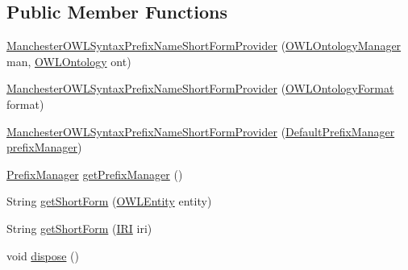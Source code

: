 \subsection*{Public Member Functions}
\begin{DoxyCompactItemize}
\item 
\hyperlink{classuk_1_1ac_1_1manchester_1_1cs_1_1owl_1_1owlapi_1_1mansyntaxrenderer_1_1_manchester_o_w_l_syn9b805e7397984f62b2f3f095697b987e_a808ad37c40144651857610f28c602e46}{Manchester\-O\-W\-L\-Syntax\-Prefix\-Name\-Short\-Form\-Provider} (\hyperlink{interfaceorg_1_1semanticweb_1_1owlapi_1_1model_1_1_o_w_l_ontology_manager}{O\-W\-L\-Ontology\-Manager} man, \hyperlink{interfaceorg_1_1semanticweb_1_1owlapi_1_1model_1_1_o_w_l_ontology}{O\-W\-L\-Ontology} ont)
\item 
\hyperlink{classuk_1_1ac_1_1manchester_1_1cs_1_1owl_1_1owlapi_1_1mansyntaxrenderer_1_1_manchester_o_w_l_syn9b805e7397984f62b2f3f095697b987e_ac0cc52c6250b54a4c8ea37652fcb4279}{Manchester\-O\-W\-L\-Syntax\-Prefix\-Name\-Short\-Form\-Provider} (\hyperlink{classorg_1_1semanticweb_1_1owlapi_1_1model_1_1_o_w_l_ontology_format}{O\-W\-L\-Ontology\-Format} format)
\item 
\hyperlink{classuk_1_1ac_1_1manchester_1_1cs_1_1owl_1_1owlapi_1_1mansyntaxrenderer_1_1_manchester_o_w_l_syn9b805e7397984f62b2f3f095697b987e_a34bd3dbcce5992648ba4ee7cd2a715b0}{Manchester\-O\-W\-L\-Syntax\-Prefix\-Name\-Short\-Form\-Provider} (\hyperlink{classorg_1_1semanticweb_1_1owlapi_1_1util_1_1_default_prefix_manager}{Default\-Prefix\-Manager} \hyperlink{classuk_1_1ac_1_1manchester_1_1cs_1_1owl_1_1owlapi_1_1mansyntaxrenderer_1_1_manchester_o_w_l_syn9b805e7397984f62b2f3f095697b987e_ad36de2fc14a17de20a948af6c6c5cef6}{prefix\-Manager})
\item 
\hyperlink{interfaceorg_1_1semanticweb_1_1owlapi_1_1model_1_1_prefix_manager}{Prefix\-Manager} \hyperlink{classuk_1_1ac_1_1manchester_1_1cs_1_1owl_1_1owlapi_1_1mansyntaxrenderer_1_1_manchester_o_w_l_syn9b805e7397984f62b2f3f095697b987e_acd3e42c786be84e32b37fd06511380d6}{get\-Prefix\-Manager} ()
\item 
String \hyperlink{classuk_1_1ac_1_1manchester_1_1cs_1_1owl_1_1owlapi_1_1mansyntaxrenderer_1_1_manchester_o_w_l_syn9b805e7397984f62b2f3f095697b987e_a1f424c36575a346e0f3932d29e0a84e3}{get\-Short\-Form} (\hyperlink{interfaceorg_1_1semanticweb_1_1owlapi_1_1model_1_1_o_w_l_entity}{O\-W\-L\-Entity} entity)
\item 
String \hyperlink{classuk_1_1ac_1_1manchester_1_1cs_1_1owl_1_1owlapi_1_1mansyntaxrenderer_1_1_manchester_o_w_l_syn9b805e7397984f62b2f3f095697b987e_add13e20a8c64bfd569a242e7a9c45591}{get\-Short\-Form} (\hyperlink{classorg_1_1semanticweb_1_1owlapi_1_1model_1_1_i_r_i}{I\-R\-I} iri)
\item 
void \hyperlink{classuk_1_1ac_1_1manchester_1_1cs_1_1owl_1_1owlapi_1_1mansyntaxrenderer_1_1_manchester_o_w_l_syn9b805e7397984f62b2f3f095697b987e_a6d12c6a9789cc5775f69d5e339ebf271}{dispose} ()
\end{DoxyCompactItemize}
